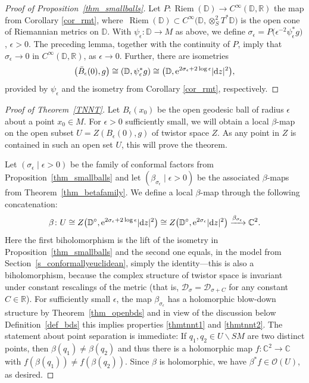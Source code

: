 \documentclass[10pt,a4paper]{amsart}
\numberwithin{equation}{section}
\theoremstyle{definition}
\newcommand{\R}{\mathbb{R}} %
\newcommand{\C}{\mathbb{C}} %
\newcommand{\DD}{\mathbb{D}} %
\newcommand{\1}{{\bf 1}}
\newcommand{\D}{\mathscr{D}}
\DeclareMathOperator{\Riem}{Riem}
\begin{document}
\begin{proof}[Proof of Proposition~\ref{thm_smallballs}]
Let $P\colon \Riem(\DD)\rightarrow C^\infty(\DD,\R)$ the map from Corollary \ref{cor_rmt}, where~${\Riem(\DD)\subset C^\infty\bigl(\DD,\otimes^2_ST^*\DD\bigr)}$ is the open cone of Riemannian metrics on $\DD$. With $\psi_\epsilon\colon \DD\rightarrow M$ as above, we define
$\sigma_\epsilon = P\bigl(\epsilon^{-2}\psi_\epsilon^*g\bigr)$, $ \epsilon >0$.
The preceding lemma, together with the continuity of $P$, imply that $\sigma_\epsilon\rightarrow 0$ in $C^\infty(\DD,\R)$, as $\epsilon\rightarrow 0$. Further, there are isometries
\[
	\bigl(\bar B_\epsilon(0),g\bigr)\cong (\DD,\psi_\epsilon^* g)\cong \bigl(\DD, {\rm e}^{2\sigma_\epsilon + 2\log \epsilon}|{\rm d}z|^2\bigr),
\]
provided by $\psi_\epsilon$ and the isometry from Corollary \ref{cor_rmt}, respectively.
\end{proof}



\begin{proof}[Proof of Theorem~\ref{TNNT}] Let $B_\epsilon(x_0)$ be the open geodesic ball of radius $\epsilon$ about a point $x_0\in M$.
For $\epsilon>0$ sufficiently small, we will obtain a local $\beta$-map on the open subset $U=Z(B_\epsilon(0),g)$ of twistor space $Z$. As any point in $Z$ is contained in such an open set $U$, this will prove the theorem.

Let $(\sigma_\epsilon\mid \epsilon >0)$ be the family of conformal factors from Proposition~\ref{thm_smallballs} and let $(\beta_{\sigma_\epsilon}\mid \epsilon>0)$ be the associated $\beta$-maps from Theorem~\ref{thm_betafamily}. We define a local $\beta$-map through the following concatenation:
\[
	\beta\colon U \cong Z\bigl(\DD^\circ,{\rm e}^{2\sigma_\epsilon+2\log \epsilon}|{\rm d}z|^2\bigr) \cong Z\bigl(\DD^\circ,{\rm e}^{2\sigma_\epsilon}|{\rm d}z|^2\bigr) \xrightarrow{\beta_{\sigma_\epsilon}}\C^2.
\]
Here the first biholomorphism is the lift of the isometry in Proposition~\ref{thm_smallballs} and the second one equals, in the model from Section~\ref{s_conformallyeuclidean}, simply the identity---this is also a biholomorphism, because the complex structure of twistor space is invariant under constant rescalings of the metric (that is, $\D_{\sigma} = \D_{\sigma+C}$ for any constant $C\in \R$).
For sufficiently small $\epsilon$, the map $\beta_{\sigma_\epsilon}$ has a holomorphic blow-down structure by Theorem~\ref{thm_openbds}
and in view of the discussion below Definition~\ref{def_bds} this implies properties \ref{thmtnnt1} and \ref{thmtnnt2}. The statement about point separation is immediate: If $q_1,q_2\in U\backslash SM$ are two distinct points, then $\beta(q_1)\neq \beta(q_2)$ and thus there is a holomorphic map $f\colon \C^2\rightarrow \C$ with $f(\beta(q_1))\neq f(\beta(q_2))$. Since $\beta$ is holomorphic, we have $\beta^*f\in \mathcal O(U)$, as desired.\end{proof}
\end{document}
